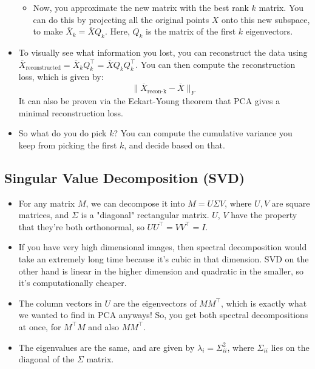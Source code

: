 \begin{itemize}
\begin{itemize}
			\item Now, you approximate the new matrix with the best rank \( k \)
				matrix. You can do this by projecting all the original points \( X \)
				onto this new subspace, to make \( \overline X_k = \overline X Q_k\).
				Here, \( Q_k \) is the matrix of the first \( k \) eigenvectors. 
		\end{itemize}
	\item To visually see what information you lost, you can reconstruct the data
		using \( \overline X_\text{reconstructed} = \overline X_k Q_k^{\top} = 
		\overline X Q_k	Q_k^{\top}\). You can then compute the reconstruction loss,
		which is given by:
		\[
			\|\overline X_\text{recon-k} - \overline X\|_F
		\]
		It can also be proven via the Eckart-Young theorem that PCA gives a minimal
		reconstruction loss. 
	\item So what do you do pick \( k \)? You can compute the cumulative variance you
		keep from picking the first \( k \), and decide based on that.  
\end{itemize}

\subsection{Singular Value Decomposition (SVD)}
\begin{itemize}
	\item For any matrix \( M \), we can decompose it into \( M = U \Sigma V \),
		where \( U, V \) are square matrices, and \( \Sigma \) is a "diagonal"
		rectangular matrix. \( U \), \( V \) have the property that they're both
		orthonormal, so \( U U^{\top} = VV^{\top} = I \). 
	\item If you have very high dimensional images, then spectral decomposition would
		take an extremely long time because it's cubic in that dimension. SVD on the
		other hand is linear in the higher dimension and quadratic in the smaller, so
		it's computationally cheaper. 
	\item The column vectors in \( U \) are the eigenvectors of \( M M^{\top} \),
		which is exactly what we wanted to find in PCA anyways! So, you get both
		spectral decompositions at once, for \( M^{\top}M \) and also \( M M^{\top}
		\). 
	\item The eigenvalues are the same, and are given by \( \lambda_i = \Sigma_{ii}^2
		\), where \( \Sigma_{ii} \) lies on the diagonal of the \( \Sigma \) matrix. 
\end{itemize}
